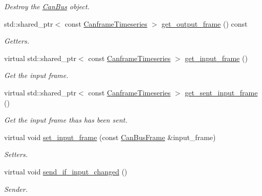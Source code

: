 \begin{DoxyCompactItemize}
\begin{DoxyCompactList}\small\item\em Destroy the \hyperlink{classblmc__drivers_1_1CanBus}{Can\+Bus} object. \end{DoxyCompactList}\item 
std\+::shared\+\_\+ptr$<$ const \hyperlink{classblmc__drivers_1_1CanBusInterface_a2da2627c961927f48359ae7d7e1aa4da}{Canframe\+Timeseries} $>$ \hyperlink{classblmc__drivers_1_1CanBus_a4504e6b71cba6d71de33925f9d401cb1}{get\+\_\+output\+\_\+frame} () const 
\begin{DoxyCompactList}\small\item\em Getters. \end{DoxyCompactList}\item 
virtual std\+::shared\+\_\+ptr$<$ const \hyperlink{classblmc__drivers_1_1CanBusInterface_a2da2627c961927f48359ae7d7e1aa4da}{Canframe\+Timeseries} $>$ \hyperlink{classblmc__drivers_1_1CanBus_a5b9282bc65bff196e6d6b393fbdc5891}{get\+\_\+input\+\_\+frame} ()
\begin{DoxyCompactList}\small\item\em Get the input frame. \end{DoxyCompactList}\item 
virtual std\+::shared\+\_\+ptr$<$ const \hyperlink{classblmc__drivers_1_1CanBusInterface_a2da2627c961927f48359ae7d7e1aa4da}{Canframe\+Timeseries} $>$ \hyperlink{classblmc__drivers_1_1CanBus_a862e9898a6607ac2e00e712c30e7f348}{get\+\_\+sent\+\_\+input\+\_\+frame} ()
\begin{DoxyCompactList}\small\item\em Get the input frame thas has been sent. \end{DoxyCompactList}\item 
virtual void \hyperlink{classblmc__drivers_1_1CanBus_ae4887644960c0a92fc82f8bdffbe9c48}{set\+\_\+input\+\_\+frame} (const \hyperlink{classblmc__drivers_1_1CanBusFrame}{Can\+Bus\+Frame} \&input\+\_\+frame)
\begin{DoxyCompactList}\small\item\em Setters. \end{DoxyCompactList}\item 
virtual void \hyperlink{classblmc__drivers_1_1CanBus_acf90b96ca5727f9ecb328ce20d7a2cbc}{send\+\_\+if\+\_\+input\+\_\+changed} ()
\begin{DoxyCompactList}\small\item\em Sender. \end{DoxyCompactList}\end{DoxyCompactItemize}
